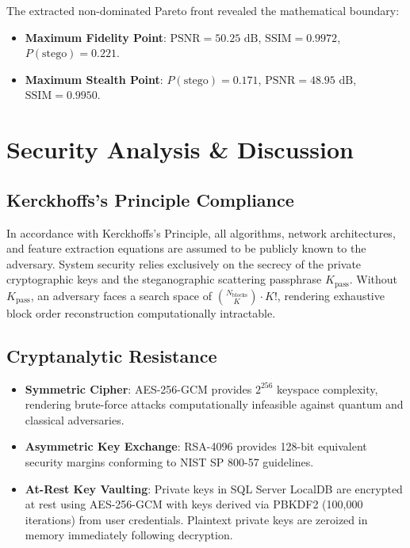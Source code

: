 \documentclass[conference]{IEEEtran}
\begin{document}
The extracted non-dominated Pareto front revealed the mathematical boundary:
\begin{itemize}
    \item \textbf{Maximum Fidelity Point}: $\text{PSNR} = 50.25\text{ dB}$, $\text{SSIM} = 0.9972$, $P(\text{stego}) = 0.221$.
    \item \textbf{Maximum Stealth Point}: $P(\text{stego}) = 0.171$, $\text{PSNR} = 48.95\text{ dB}$, $\text{SSIM} = 0.9950$.
\end{itemize}

\section{Security Analysis \& Discussion}

\subsection{Kerckhoffs's Principle Compliance}
In accordance with Kerckhoffs's Principle, all algorithms, network architectures, and feature extraction equations are assumed to be publicly known to the adversary. System security relies exclusively on the secrecy of the private cryptographic keys and the steganographic scattering passphrase $K_{\text{pass}}$. Without $K_{\text{pass}}$, an adversary faces a search space of $\binom{N_{\text{blocks}}}{K} \cdot K!$, rendering exhaustive block order reconstruction computationally intractable.

\subsection{Cryptanalytic Resistance}
\begin{itemize}
    \item \textbf{Symmetric Cipher}: AES-256-GCM provides $2^{256}$ keyspace complexity, rendering brute-force attacks computationally infeasible against quantum and classical adversaries.
    \item \textbf{Asymmetric Key Exchange}: RSA-4096 provides 128-bit equivalent security margins conforming to NIST SP 800-57 guidelines.
    \item \textbf{At-Rest Key Vaulting}: Private keys in SQL Server LocalDB are encrypted at rest using AES-256-GCM with keys derived via PBKDF2 (100,000 iterations) from user credentials. Plaintext private keys are zeroized in memory immediately following decryption.
\end{itemize}
\end{document}
